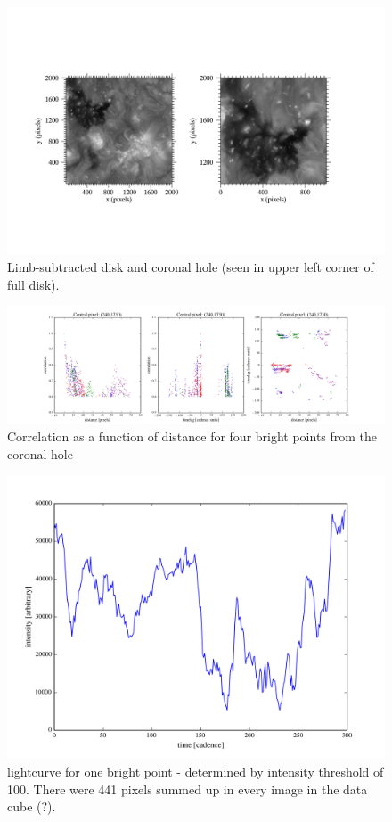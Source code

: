 \documentclass[preprint]{aastex}
\begin{document}
\begin{figure}
        \includegraphics[width=\textwidth]{../figures/full_ch.png}
        \caption{Limb-subtracted disk and coronal hole (seen in
        upper left corner of full disk).}
\end{figure}%
\begin{figure}[htb!]
    \centering
    \includegraphics[width=\textwidth]{../figures/bp1_cool.png}
    \caption{Correlation as a function of distance for four bright
    points from the coronal hole}
\end{figure}
\begin{figure}[htb!]
    \centering
    \includegraphics[width=\textwidth]{../figures/lightcurve2.png}
    \caption{lightcurve for one bright point - determined by
        intensity threshold of 100. There were 441 pixels summed up in
        every image in the data cube (?).}
\end{figure}
\end{document}
